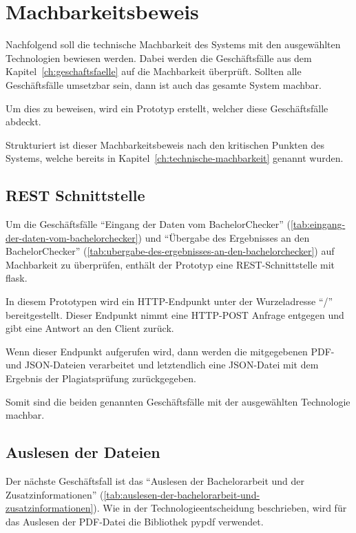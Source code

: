 \section{Machbarkeitsbeweis}\label{sec:machbarkeitsbeweis}

Nachfolgend soll die technische Machbarkeit des Systems mit den ausgewählten Technologien bewiesen werden.
Dabei werden die Geschäftsfälle aus dem Kapitel~\ref{ch:geschaftsfaelle} auf die Machbarkeit überprüft.
Sollten alle Geschäftsfälle umsetzbar sein, dann ist auch das gesamte System machbar.

Um dies zu beweisen, wird ein Prototyp erstellt, welcher diese Geschäftsfälle abdeckt.

Strukturiert ist dieser Machbarkeitsbeweis nach den kritischen Punkten des Systems,
welche bereits in Kapitel~\ref{ch:technische-machbarkeit} genannt wurden.

\subsection{REST Schnittstelle}\label{subsec:rest-schnittstelle}
Um die Geschäftsfälle ``Eingang der Daten vom BachelorChecker'' (\ref{tab:eingang-der-daten-vom-bachelorchecker})
und ``Übergabe des Ergebnisses an den BachelorChecker'' (\ref{tab:ubergabe-des-ergebnisses-an-den-bachelorchecker})
auf Machbarkeit zu überprüfen, enthält der Prototyp eine REST-Schnittstelle mit flask.

In diesem Prototypen wird ein HTTP-Endpunkt unter der Wurzeladresse ``/'' bereitgestellt.
Dieser Endpunkt nimmt eine HTTP-POST Anfrage entgegen und gibt eine Antwort an den Client zurück.

Wenn dieser Endpunkt aufgerufen wird, dann werden die mitgegebenen PDF- und JSON-Dateien verarbeitet
und letztendlich eine JSON-Datei mit dem Ergebnis der Plagiatsprüfung zurückgegeben.

Somit sind die beiden genannten Geschäftsfälle mit der ausgewählten Technologie machbar.

\subsection{Auslesen der Dateien}\label{subsec:auslesen-der-dateien}
Der nächste Geschäftsfall ist das ``Auslesen der Bachelorarbeit und der Zusatzinformationen'' (\ref{tab:auslesen-der-bachelorarbeit-und-zusatzinformationen}).
Wie in der Technologieentscheidung beschrieben, wird für das Auslesen der PDF-Datei die Bibliothek pypdf verwendet.

